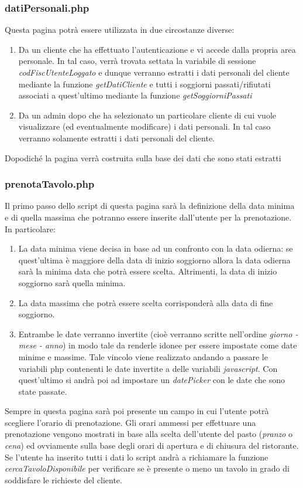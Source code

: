 \documentclass [a4paper, 12pt]{book}
\begin{document}
\subsubsection{datiPersonali.php}
Questa pagina potrà essere utilizzata in due circostanze diverse: 
\begin{enumerate}
\item Da un cliente che ha effettuato l'autenticazione e vi accede dalla propria area personale. In tal caso, verrà trovata settata la variabile di sessione \textit{codFiscUtenteLoggato} e dunque verranno estratti i dati personali del cliente mediante la funzione \textit{getDatiCliente} e tutti i soggiorni passati/rifiutati associati a quest'ultimo mediante la funzione \textit{getSoggiorniPassati}
\item Da un admin dopo che ha selezionato un particolare cliente di cui vuole visualizzare (ed eventualmente modificare) i dati personali. In tal caso verranno solamente estratti i dati personali del cliente.
\end{enumerate}
Dopodiché la pagina verrà costruita sulla base dei dati che sono stati estratti

\subsubsection{prenotaTavolo.php}
Il primo passo dello script di questa pagina sarà la definizione della data minima e di quella massima che potranno essere inserite dall'utente per la prenotazione. In particolare:
\begin{enumerate}
\item La data minima viene decisa in base ad un confronto con la data odierna: se quest'ultima è maggiore della data di inizio soggiorno allora la data odierna sarà la minima data che potrà essere scelta. Altrimenti, la data di inizio soggiorno sarà quella minima.
\item La data massima che potrà essere scelta corrisponderà alla data di fine soggiorno.
\item Entrambe le date verranno invertite (cioè verranno scritte nell'ordine \textit{giorno - mese - anno}) in modo tale da renderle idonee per essere impostate come date minime e massime. Tale vincolo viene realizzato andando a passare le variabili php contenenti le date invertite a delle variabili \textit{javascript}. Con quest'ultimo si andrà poi ad impostare un \textit{datePicker} con le date che sono state passate.
\end{enumerate}
Sempre in questa pagina sarà poi presente un campo in cui l'utente potrà scegliere l'orario di prenotazione. Gli orari ammessi per effettuare una prenotazione vengono mostrati in base alla scelta dell'utente del pasto (\textit{pranzo} o \textit{cena}) ed ovviamente sulla base degli orari di apertura e di chiusura del ristorante. Se l'utente ha inserito tutti i dati lo script andrà a richiamare la funzione \textit{cercaTavoloDisponibile} per verificare se è presente o meno un tavolo in grado di soddisfare le richieste del cliente.
\end{document}
